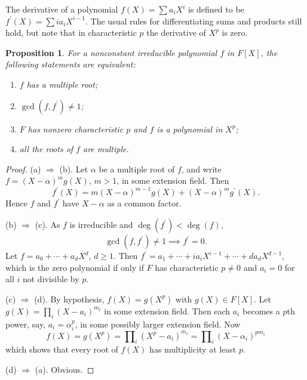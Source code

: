 \documentclass[a4paper,11pt,final,openany]{memoir}
\newtheorem{proposition}[X]{Proposition}
\theoremstyle{nonumberplain}
\newtheorem{proof}{Proof.}
\begin{document}
The derivative of a polynomial $f(X)=\sum a_{i}X^{i}$ is defined to be
$f^{\prime}(X)=\sum ia_{i}X^{i-1}$. The usual rules for differentiating sums
and products still hold, but note that in characteristic $p$ the derivative of
$X^{p}$ is zero.

\begin{proposition}
\label{ft3}For a nonconstant irreducible polynomial $f$ in $F[X]$, the
following statements are equivalent:

\begin{enumerate}
\item $f$ has a multiple root;

\item $\gcd(f,f^{\prime})\neq1$;

\item $F$ has nonzero characteristic $p$ and $f$ is a polynomial in $X^{p}$;

\item all the roots of $f$ are multiple.
\end{enumerate}
\end{proposition}

\begin{proof}
(a) $\Rightarrow$ (b). Let $\alpha$ be a multiple root of $f$, and write
$f=(X-\alpha)^{m}g(X)$, $m>1$, in some extension field. Then
\begin{equation}
f^{\prime}(X)=m(X-\alpha)^{m-1}g(X)+(X-\alpha)^{m}g^{\prime}(X). \label{eq2}%
\end{equation}
Hence $f$ and $f^{\prime}$ have $X-\alpha$ as a common factor.

(b) $\Rightarrow$ (c). As $f$ is irreducible and $\deg(f^{\prime})<\deg(f)$,
\[
\gcd(f,f^{\prime})\neq1\implies f^{\prime}=0.
\]
Let $f=a_{0}+\cdots+a_{d}X^{d}$, $d\geq1$. Then $f^{\prime}=a_{1}%
+\cdots+ia_{i}X^{i-1}+\cdots+da_{d}X^{d-1}$, which is the zero polynomial if
only if $F$ has characteristic $p\neq0$ and $a_{i}=0$ for all $i$ not
divisible by $p$.

(c) $\Rightarrow$ (d). By hypothesis, $f(X)=g(X^{p})$ with $g(X)\in F[X]$. Let
$g(X)=\prod_{i}(X-a_{i})^{m_{i}}$ in some extension field. Then each $a_{i}$
becomes a $p$th power, say, $a_{i}=\alpha_{i}^{p}$, in some possibly larger
extension field. Now
\[
f(X)=g(X^{p})=\prod\nolimits_{i}(X^{p}-a_{i})^{m_{i}}=\prod\nolimits_{i}%
(X-\alpha_{i})^{pm_{i}}%
\]
which shows that every root of $f(X)$ has multiplicity at least $p$.

(d) $\Rightarrow$ (a). Obvious.
\end{proof}
\end{document}
